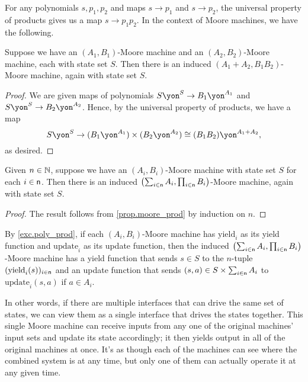\documentclass[Book-Poly]{subfiles}
\begin{document}
For any polynomials $s,p_1,p_2$ and maps $s\to p_1$ and $s\to p_2$, the universal property of products gives us a map $s\to p_1p_2$. In the context of Moore machines, we have the following.

\begin{proposition} \label{prop.moore_prod}
Suppose we have an $(A_1,B_1)$-Moore machine and an $(A_2,B_2)$-Moore machine, each with state set $S$. Then there is an induced $(A_1+A_2,B_1 B_2)$-Moore machine, again with state set $S$.
\end{proposition}
\begin{proof}
We are given maps of polynomials $S\yon^S\to B_1\yon^{A_1}$ and $S\yon^S\to B_2\yon^{A_2}$. Hence, by the universal property of products, we have a map
\[
  S\yon^S\to
  (B_1\yon^{A_1})\times(B_2\yon^{A_2})
  \cong(B_1B_2)\yon^{A_1+A_2},
\] 
as desired.
\end{proof}

\begin{corollary}
Given $n \in \mathbb{N}$, suppose we have an $(A_i,B_i)$-Moore machine with state set $S$ for each $i \in \mathsf{n}$. Then there is an induced $\left(\sum_{i \in \mathsf{n}} A_i, \prod_{i \in \mathsf{n}} B_i\right)$-Moore machine, again with state set $S$.
\end{corollary}
\begin{proof}
The result follows from \cref{prop.moore_prod} by induction on $n$.
\end{proof}

By \cref{exc.poly_prod}, if each $(A_i,B_i)$-Moore machine has $\text{yield}_i$ as its yield function and $\text{update}_i$ as its update function, then the induced $\left(\sum_{i \in \mathsf{n}} A_i, \prod_{i \in \mathsf{n}} B_i\right)$-Moore machine has a yield function that sends $s \in S$ to the $n$-tuple $(\text{yield}_i(s))_{i \in \mathsf{n}}$ and an update function that sends $(s, a) \in S \times \sum_{i \in \mathsf{n}} A_i$ to $\text{update}_i(s, a)$ if $a \in A_i$.

In other words, if there are multiple interfaces that can drive the same set of states, we can view them as a single interface that drives the states together.
This single Moore machine can receive inputs from any one of the original machines' input sets and update its state accordingly; it then yields output in all of the original machines at once. It's as though each of the machines can see where the combined system is at any time, but only one of them can actually operate it at any given time.
\end{document}

